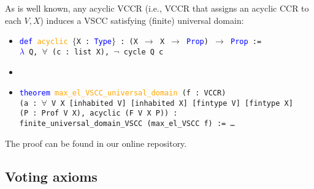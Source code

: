 \documentclass[runningheads]{llncs}
\begin{document}
As is well known, any acyclic VCCR (i.e., VCCR that assigns an acyclic CCR to each $V,X$) induces a VSCC satisfying (finite) universal domain:
\begin{itemize}
\item[] \texttt{\textcolor{blue}{def} \textcolor{orange}{acyclic} $\{$X : \textcolor{blue}{Type}$\}$ : (X $\to$ X $\to$ \textcolor{blue}{Prop}) $\to$ \textcolor{blue}{Prop} :=}\\
\texttt{\textcolor{blue}{$\lambda$} Q, $\forall$ (c : list X), $\neg$ cycle Q c}
\item[]
\item[] \texttt{\textcolor{blue}{theorem} \textcolor{orange}{max\_el\_VSCC\_universal\_domain} (f : VCCR)}\\
\texttt{(a : $\forall$ V X [inhabited V] [inhabited X] [fintype V] [fintype X]} \\
\texttt{(P : Prof V X), acyclic (F V X P)) :}\\
\texttt{finite\_universal\_domain\_VSCC (max\_el\_VSCC f) := \dots}
\end{itemize}
The proof can be found in our online repository.

\subsection{Voting axioms}\label{VotingAxioms}
\end{document}
